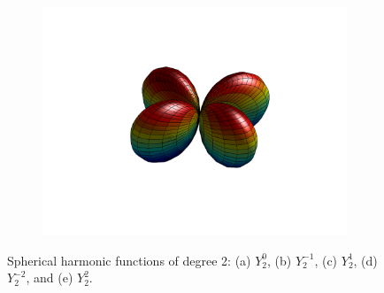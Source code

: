 \begin{figure}
\begin{subfigure}[b]{0.40\textwidth}
		\includegraphics[width=\textwidth]{figures/appendices/Y_2_2.png}
		\caption{}
	\end{subfigure}
\caption{Spherical harmonic functions of degree 2: (a) $Y_{2}^{0}$, (b) $Y_{2}^{-1}$, (c) $Y_{2}^{1}$, (d) $Y_{2}^{-2}$, and (e) $Y_{2}^{2}$.}
\end{figure}

